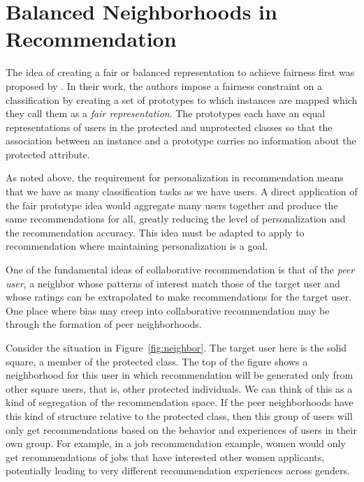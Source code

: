 


\section{Balanced Neighborhoods in Recommendation}

The idea of creating a fair or balanced representation to achieve fairness first was proposed by \cite{zemel2013learning}. In their work, the authors impose a fairness constraint on a classification by creating a set of prototypes to which instances are mapped which they call them as a \textit{fair representation}. The prototypes each have an equal representations of users in the protected and unprotected classes so that the association between an instance and a prototype carries no information about the protected attribute. 

As noted above, the requirement for personalization in recommendation means that we have as many classification tasks as we have users. A direct application of the fair prototype idea would aggregate many users together and produce the same recommendations for all, greatly reducing the level of personalization and the recommendation accuracy. This idea must be adapted to apply to recommendation where maintaining personalization is a goal.

One of the fundamental ideas of collaborative recommendation is that of the \textit{peer user}, a neighbor whose patterns of interest match those of the target user and whose ratings can be extrapolated to make recommendations for the target user. One place where bias may creep into collaborative recommendation may be through the formation of peer neighborhoods. 

Consider the situation in Figure~\ref{fig:neighbor}. The target user here is the solid square, a member of the protected class. The top of the figure shows a neighborhood for this user in which recommendation will be generated only from other square users, that is, other protected individuals. We can think of this as a kind of segregation of the recommendation space. If the peer neighborhoods have this kind of structure relative to the protected class, then this group of users will only get recommendations based on the behavior and experiences of users in their own group. For example, in a job recommendation example, women would only get recommendations of jobs that have interested other women applicants, potentially leading to very different recommendation experiences across genders. 


